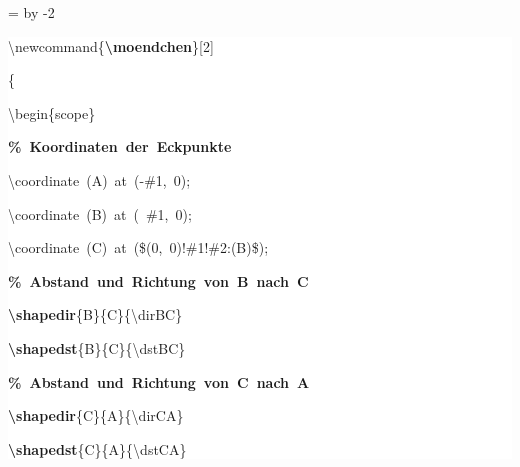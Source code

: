 \begingroup
\ttfamily
{}
=\textwidth
\advance{} by -2\fboxsep
\noindent
\colorbox{background}
{%
\parbox{\dimen255}
{%
\rule[-0.5ex]{0pt}{2.5ex}\hspace*{0.0em}\textbackslash{}newcommand\{\textcolor{R}{\textbf{\textbackslash{}moendchen}}\}[2]\\
\rule[-0.5ex]{0pt}{2.5ex}\hspace*{0.0em}\{\\
\rule[-0.5ex]{0pt}{2.5ex}\hspace*{1.0em}\textbackslash{}begin\{scope\}\\
\rule[-0.5ex]{0pt}{2.5ex}\hspace*{2.0em}\textcolor{G}{\textbf{\%~Koordinaten~der~Eckpunkte}}\\
\rule[-0.5ex]{0pt}{2.5ex}\hspace*{2.0em}\textbackslash{}coordinate~(A)~at~({-}\#1,~0);\\
\rule[-0.5ex]{0pt}{2.5ex}\hspace*{2.0em}\textbackslash{}coordinate~(B)~at~(~\#1,~0);\\
\rule[-0.5ex]{0pt}{2.5ex}\hspace*{2.0em}\textbackslash{}coordinate~(C)~at~(\$(0,~0)!\#1!\#2:(B)\$);\\
\rule[-0.5ex]{0pt}{2.5ex}\hspace*{2.0em}\textcolor{G}{\textbf{\%~Abstand~und~Richtung~von~B~nach~C}}\\
\rule[-0.5ex]{0pt}{2.5ex}\hspace*{2.0em}\textcolor{R}{\textbf{\textbackslash{}shapedir}}\{B\}\{C\}\{\textbackslash{}dirBC\}\\
\rule[-0.5ex]{0pt}{2.5ex}\hspace*{2.0em}\textcolor{R}{\textbf{\textbackslash{}shapedst}}\{B\}\{C\}\{\textbackslash{}dstBC\}\\
\rule[-0.5ex]{0pt}{2.5ex}\hspace*{2.0em}\textcolor{G}{\textbf{\%~Abstand~und~Richtung~von~C~nach~A}}\\
\rule[-0.5ex]{0pt}{2.5ex}\hspace*{2.0em}\textcolor{R}{\textbf{\textbackslash{}shapedir}}\{C\}\{A\}\{\textbackslash{}dirCA\}\\
\rule[-0.5ex]{0pt}{2.5ex}\hspace*{2.0em}\textcolor{R}{\textbf{\textbackslash{}shapedst}}\{C\}\{A\}\{\textbackslash{}dstCA\}\\
}}
